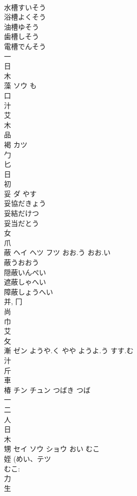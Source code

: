 \documentclass[8pt]{extreport}
\begin{document}
\begin{CJK}{UTF8}{min}
\\	水槽すいそう 
\\	浴槽よくそう 
\\	油槽ゆそう 
\\	歯槽しそう 
\\	電槽でんそう 
\\	一 
\\	日 
\\	木 
\\	藻	ソウ	も	
\\	口 
\\	汁 
\\	艾 
\\	木 
\\	品 
\\	褐	カツ		
\\	勹 
\\	匕 
\\	日 
\\	初 
\\	妥	ダ	やす	
\\	妥協だきょう
\\	妥結だけつ
\\	妥当だとう
\\	女 
\\	爪 
\\	蔽	ヘイ ヘツ フツ	おお.う おお.い	
\\	蔽うおおう 
\\	隠蔽いんぺい 
\\	遮蔽しゃへい 
\\	障蔽しょうへい 
\\	并, 冂 
\\	尚 
\\	巾 
\\	艾 
\\	攵 
\\	漸	ゼン	ようや.く やや ようよ.う すす.む	
\\	汁 
\\	斤 
\\	車 
\\	椿	チン チュン	つばき つば	
\\	一 
\\	二 
\\	人 
\\	日 
\\	木 
\\	甥	セイ ソウ ショウ	おい むこ	
\\	姪 (めい、テツ 
\\	むこ: 
\\	力 
\\	生 

\end{CJK}
\end{document}
